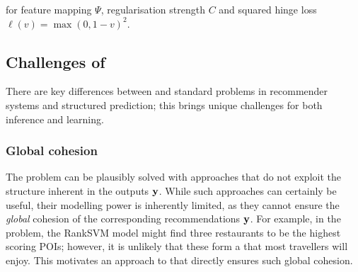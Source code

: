 for
feature mapping $\Psi$,
regularisation strength $C$ %
and squared hinge loss $\ell( v ) = \max( 0, 1 - v )^2$.



\subsection{Challenges of {\trajrec}}

There are key differences between {\seqrec} and %
standard problems in recommender systems and structured prediction;
this brings unique challenges for both inference and learning.

%
\subsubsection{Global cohesion}
The {\seqrec} problem can be plausibly solved with approaches that do not exploit the structure inherent in the outputs $\mathbf{y}$. %
While such approaches can certainly be useful,
their modelling power is inherently limited,
as
they cannot ensure the \emph{global} cohesion of the corresponding recommendations $\mathbf{y}$.
For example, in the {\trajrec} problem, the RankSVM model %
might find three restaurants to be the highest scoring POIs;
however, it is unlikely that these form a {\trajectory} that most travellers will enjoy.
This motivates an approach to {\seqrec} that directly ensures such global cohesion.


